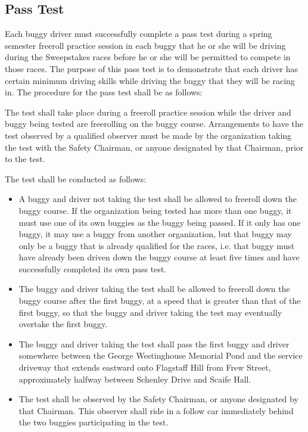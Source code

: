 \subsection{Pass Test}

	Each buggy driver must successfully complete a pass test during a spring
	semester freeroll practice session in each buggy that he or she will be driving
	during the Sweepstakes races before he or she will be permitted to compete in
	those races. The purpose of this pass test is to demonstrate that each driver
	has certain minimum driving skills while driving the buggy that they will be
	racing in. The procedure for the pass test shall be as follows:
	\newline

	The test shall take place during a freeroll practice session while the driver
	and buggy being tested are freerolling on the buggy course. Arrangements to
	have the test observed by a qualified observer must be made by the organization
	taking the test with the Safety Chairman, or anyone designated by that
	Chairman, prior to the test.
	\newline

	\noindent The test shall be conducted as follows:

	\begin{itemize}

		\item A buggy and driver not taking the test shall be allowed to freeroll
		down the buggy course. If the organization being tested has more than one
		buggy, it must use one of its own buggies as the buggy being passed. If it only
		has one buggy, it may use a buggy from another organization, but that buggy may
		only be a buggy that is already qualified for the races, i.e. that buggy must
		have already been driven down the buggy course at least five times and have
		successfully completed its own pass test.

		\item The buggy and driver taking the test shall be allowed to freeroll
		down the buggy course after the first buggy, at a speed that is greater than
		that of the first buggy, so that the buggy and driver taking the test may
		eventually overtake the first buggy.

		\item The buggy and driver taking the test shall pass the first buggy and
		driver somewhere between the George Westinghouse Memorial Pond and the service
		driveway that extends eastward onto Flagstaff Hill from Frew Street,
		approximately halfway between Schenley Drive and Scaife Hall.

		\item The test shall be observed by the Safety Chairman, or anyone
		designated by that Chairman. This observer shall ride in a follow car
		immediately behind the two buggies participating in the test.

	\end{itemize}

